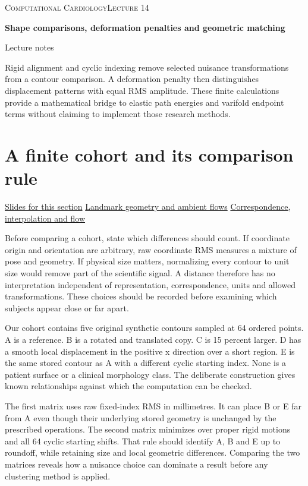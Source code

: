 \documentclass[11pt,letterpaper]{article}
\theoremstyle{definition}\newtheorem{definition}{Definition}\newtheorem{example}{Example}
\numberwithin{equation}{section}
\begin{document}
{\small\scshape Computational Cardiology\hfill Lecture 14}\par\medskip
{\raggedright{}\LARGE\bfseries\color{ink} Shape comparisons, deformation penalties and geometric matching\par}\medskip
{\small Lecture notes}\par\bigskip
Rigid alignment and cyclic indexing remove selected nuisance transformations from a contour comparison. A deformation penalty then distinguishes displacement patterns with equal RMS amplitude. These finite calculations provide a mathematical bridge to elastic path energies and varifold endpoint terms without claiming to implement those research methods.

\section{A finite cohort and its comparison rule}
\hypertarget{note-a-finite-cohort-and-its-comparison-rule}{}\label{note:a-finite-cohort-and-its-comparison-rule}
{\small \href{slides.html\#frame=a-comparison-requires-an-invariance-choice\&step=1}{Slides for this section} \quad \href{../modules/shape-lab/index.html}{Landmark geometry and ambient flows} \quad \href{../modules/animations/landmark-flow.html}{Correspondence, interpolation and flow}}\par
Before comparing a cohort, state which differences should count. If coordinate origin and orientation are arbitrary, raw coordinate RMS measures a mixture of pose and geometry. If physical size matters, normalizing every contour to unit size would remove part of the scientific signal. A distance therefore has no interpretation independent of representation, correspondence, units and allowed transformations. These choices should be recorded before examining which subjects appear close or far apart.

Our cohort contains five original synthetic contours sampled at 64 ordered points. A is a reference. B is a rotated and translated copy. C is 15 percent larger. D has a smooth local displacement in the positive x direction over a short region. E is the same stored contour as A with a different cyclic starting index. None is a patient surface or a clinical morphology class. The deliberate construction gives known relationships against which the computation can be checked.

The first matrix uses raw fixed-index RMS in millimetres. It can place B or E far from A even though their underlying stored geometry is unchanged by the prescribed operations. The second matrix minimizes over proper rigid motions and all 64 cyclic starting shifts. That rule should identify A, B and E up to roundoff, while retaining size and local geometric differences. Comparing the two matrices reveals how a nuisance choice can dominate a result before any clustering method is applied.
\end{document}
